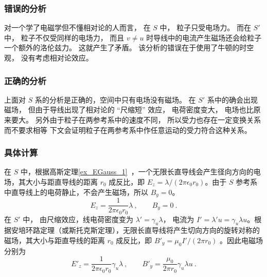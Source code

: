 \subsubsection{错误的分析}
对一个学了电磁学但不懂相对论的人而言， 在 $S$ 中， 粒子只受电场力。 而在 $S'$ 中， 粒子不仅受同样的电场力， 而且 $v \ne u$ 时导线中的电流产生磁场还会给粒子一个额外的洛伦兹力。 这就产生了矛盾。 该分析的错误在于使用了牛顿的时空观， 没有考虑相对论效应。

\subsubsection{正确的分析}
上面对 $S$ 系的分析是正确的，空间中只有电场没有磁场。 在 $S'$ 系中的确会出现磁场， 但由于导线出现了相对论的 “尺缩短” 效应，%
电荷密度变大， 电场也比原来要大。 另外由于粒子在两参考系中的速度不同， 所以受力也存在一定变换关系而不要求相等%
下文会证明粒子在两参考系中作任意运动的受力符合这种关系。

\subsubsection{具体计算}
在 $S$ 中，根据高斯定理\autoref{ex_EGauss_1}~，一个无限长直导线会产生径向方向的电场，其大小与距直导线的距离 $r_0$ 成反比，即 $E_z=\lambda/(2\pi\epsilon_0r_0)$。由于 $S$ 参考系中直导线上的电荷静止，不会产生磁场，所以 $B_y=0$。
\begin{equation}
E_{z} = \frac{1}{2\pi\epsilon_0 r_0} \lambda~,
\qquad
B_{y} = 0~.
\end{equation}
在 $S'$ 中， 由尺缩效应，线电荷密度变为 $\lambda' = \gamma_u \lambda$， 电流为 $I' = \lambda' u = \gamma_u \lambda u$。根据安培环路定理（或斯托克斯定理），无限长直导线将产生切向方向的旋转对称的磁场，其大小与距直导线的距离 $r_0$ 成反比，即 $B'_y=\mu_0 I' /(2\pi r_0)$%
。因此电磁场分别为
\begin{equation}
E'_z = \frac{1}{2\pi\epsilon_0 r_0} \gamma_u \lambda~,
\qquad
B'_y = \frac{\mu_0}{2\pi r_0}\gamma_u \lambda u~.
\end{equation}

